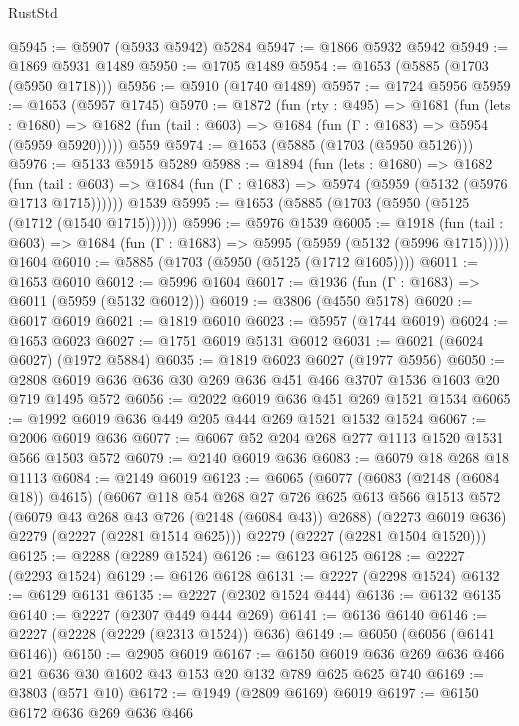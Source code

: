 \begin{lexlean}{RustStd}
\begin{coremodule}
@5945 := @5907 (@5933 @5942) @5284
@5947 := @1866 @5932 @5942
@5949 := @1869 @5931 @1489
@5950 := @1705 @1489
@5954 := @1653 (@5885 (@1703 (@5950 @1718)))
@5956 := @5910 (@1740 @1489)
@5957 := @1724 @5956
@5959 := @1653 (@5957 @1745)
@5970 := @1872
    (fun (rty : @495) =>
    @1681
      (fun (lets : @1680) =>
      @1682 (fun (tail : @603) => @1684 (fun (Γ : @1683) => @5954 (@5959 @5920)))))
    @559
@5974 := @1653 (@5885 (@1703 (@5950 @5126)))
@5976 := @5133 @5915 @5289
@5988 := @1894
    (fun (lets : @1680) =>
    @1682
      (fun (tail : @603) => @1684 (fun (Γ : @1683) => @5974 (@5959 (@5132 (@5976 @1713 @1715))))))
    @1539
@5995 := @1653 (@5885 (@1703 (@5950 (@5125 (@1712 (@1540 @1715))))))
@5996 := @5976 @1539
@6005 := @1918
    (fun (tail : @603) => @1684 (fun (Γ : @1683) => @5995 (@5959 (@5132 (@5996 @1715)))))
    @1604
@6010 := @5885 (@1703 (@5950 (@5125 (@1712 @1605))))
@6011 := @1653 @6010
@6012 := @5996 @1604
@6017 := @1936 (fun (Γ : @1683) => @6011 (@5959 (@5132 @6012)))
@6019 := @3806 (@4550 @5178)
@6020 := @6017 @6019
@6021 := @1819 @6010
@6023 := @5957 (@1744 @6019)
@6024 := @1653 @6023
@6027 := @1751 @6019 @5131 @6012
@6031 := @6021 (@6024 @6027) (@1972 @5884)
@6035 := @1819 @6023 @6027 (@1977 @5956)
@6050 := @2808 @6019 @636 @636 @30 @269 @636 @451 @466 @3707 @1536 @1603 @20 @719 @1495 @572
@6056 := @2022 @6019 @636 @451 @269 @1521 @1534
@6065 := @1992 @6019 @636 @449 @205 @444 @269 @1521 @1532 @1524
@6067 := @2006 @6019 @636
@6077 := @6067 @52 @204 @268 @277 @1113 @1520 @1531 @566 @1503 @572
@6079 := @2140 @6019 @636
@6083 := @6079 @18 @268 @18 @1113
@6084 := @2149 @6019
@6123 := @6065
    (@6077
      (@6083 (@2148 (@6084 @18)) @4615)
      (@6067
        @118
        @54
        @268
        @27
        @726
        @625
        @613
        @566
        @1513
        @572
        (@6079 @43 @268 @43 @726 (@2148 (@6084 @43)) @2688)
        (@2273 @6019 @636)
        @2279
        (@2227 (@2281 @1514 @625)))
      @2279
      (@2227 (@2281 @1504 @1520)))
@6125 := @2288 (@2289 @1524)
@6126 := @6123 @6125
@6128 := @2227 (@2293 @1524)
@6129 := @6126 @6128
@6131 := @2227 (@2298 @1524)
@6132 := @6129 @6131
@6135 := @2227 (@2302 @1524 @444)
@6136 := @6132 @6135
@6140 := @2227 (@2307 @449 @444 @269)
@6141 := @6136 @6140
@6146 := @2227 (@2228 (@2229 (@2313 @1524)) @636)
@6149 := @6050 (@6056 (@6141 @6146))
@6150 := @2905 @6019
@6167 := @6150 @6019 @636 @269 @636 @466 @21 @636 @30 @1602 @43 @153 @20 @132 @789 @625 @625 @740
@6169 := @3803 (@571 @10)
@6172 := @1949 (@2809 @6169) @6019
@6197 := @6150
    @6172
    @636
    @269
    @636
    @466

\end{coremodule}
\end{lexlean}
